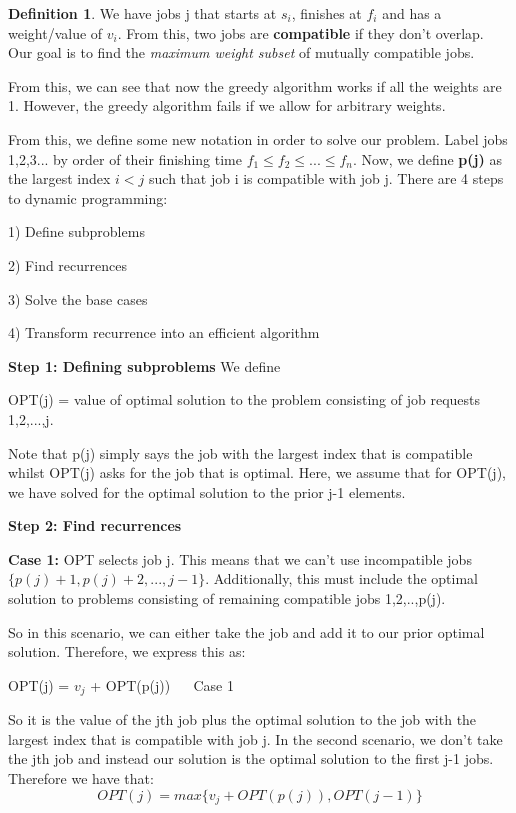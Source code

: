 \documentclass[11pt, oneside]{article}
\theoremstyle{definition}
\newtheorem{definition}{Definition}[section]
\begin{document}
\begin{definition}
  We have jobs j that starts at $s_i$, finishes at $f_i$ and has a weight/value of $v_i$. From this, two jobs are \textbf{compatible} if they don't overlap. Our goal is to find the \textit{maximum weight subset} of mutually compatible jobs.
\end{definition}

From this, we can see that now the greedy algorithm works if all the weights are 1. However, the greedy algorithm fails if we allow for arbitrary weights.

From this, we define some new notation in order to solve our problem. Label jobs 1,2,3... by order of their finishing time $f_1 \leq f_2 \leq ... \leq f_n$. Now, we define \textbf{p(j)} as the largest index $i < j$ such that job i is compatible with job j. There are 4 steps to dynamic programming:
\begin{center}
  1) Define subproblems

  2) Find recurrences

  3) Solve the base cases

  4) Transform recurrence into an efficient algorithm
\end{center}

\textbf{Step 1: Defining subproblems}
We define
\begin{center}
  OPT(j) = value of optimal solution to the problem consisting of job requests 1,2,...,j.
\end{center}
Note that p(j) simply says the job with the largest index that is compatible whilst OPT(j) asks for the job that is optimal. Here, we assume that for OPT(j), we have solved for the optimal solution to the prior j-1 elements.

\textbf{Step 2: Find recurrences}
\begin{center}
  \textbf{Case 1:} OPT selects job j. This means that we can't use incompatible jobs $\{p(j) + 1, p(j) + 2,..., j-1 \}$. Additionally, this must include the optimal solution to problems consisting of remaining compatible jobs 1,2,..,p(j).
\end{center}
So in this scenario, we can either take the job and add it to our prior optimal solution. Therefore, we express this as:
\begin{center}
  OPT(j) = $v_j$ + OPT(p(j)) $\quad$ Case 1
\end{center}
So it is the value of the jth job plus the optimal solution to the job with the largest index that is compatible with job j. In the second scenario, we don't take the jth job and instead our solution is the optimal solution to the first j-1 jobs. Therefore we have that:
$$
OPT(j) = max\{v_j + OPT(p(j)), OPT(j-1)\}
$$
\end{document}
